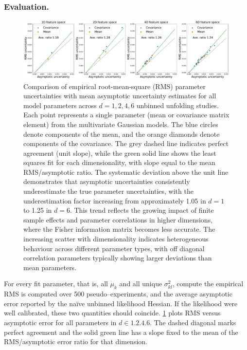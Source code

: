         \subsubsection{Evaluation.}
\begin{figure}
    \centering
    \includegraphics[width=\linewidth]{figures/chapter-07/nn-uncertainties-vs-nd.pdf}
    \caption[Validation of asymptotic uncertainty estimates across dimensionalities in unbinned unfolding.]{Comparison of empirical root-mean-square (RMS) parameter uncertainties with mean asymptotic uncertainty estimates for all model parameters across \(d = 1, 2, 4, 6\) unbinned unfolding studies. Each point represents a single parameter (mean or covariance matrix element) from the multivariate Gaussian models.
    The blue circles denote components of the mean, and the orange diamonds denote components of the covariance.
    The grey dashed line indicates perfect agreement (unit slope), while the green solid line shows the least squares fit for each dimensionality, with slope equal to the mean RMS/asymptotic ratio. 
    The systematic deviation above the unit line demonstrates that asymptotic uncertainties consistently underestimate the true parameter uncertainties, with the underestimation factor increasing from approximately 1.05 in \(d = 1\) to 1.25 in \(d = 6\).
    This trend reflects the growing impact of finite sample effects and parameter correlations in higher dimensions, where the Fisher information matrix becomes less accurate. 
    The increasing scatter with dimensionality indicates heterogeneous behaviour across different parameter types, with off diagonal correlation parameters typically showing larger deviations than mean parameters.\footnotemark}
    \label{fig:rms-asy-dim}
\end{figure}
            For every fit parameter, that is, all $\mu_k$ and all unique $\sigma^2_{kl}$, compute the empirical RMS is computed over 500 pseudo--experiments, and the average asymptotic error reported by the na\"ive unbinned likelihood Hessian.
            If the likelihood were well calibrated, these two quantities
            should coincide.
            \cref{fig:rms-asy-dim} plots RMS versus asymptotic error for all parameters in \(d \in\qty{1, 2, 4, 6}\).
            The dashed diagonal marks perfect agreement and the solid green line has a slope fixed to the mean of the RMS/asymptotic error ratio for that dimension.
            
